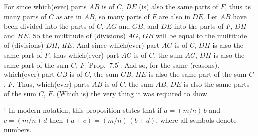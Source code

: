 \begin{Parallel}{}{}
{For since which(ever) parts $AB$ is of $C$, $DE$ (is) also the same parts  of $F$,
thus as many parts of $C$ as are in $AB$, so many 
 parts of $F$ are also in $DE$. Let $AB$ have been divided into the parts of
$C$, $AG$ and $GB$, and $DE$ into the parts of $F$, $DH$ and $HE$. So the
multitude of (divisions) $AG$, $GB$ will be equal to the multitude
of (divisions) $DH$, $HE$. And since which(ever) part $AG$ is of $C$, $DH$ is
also the same part of $F$, thus which(ever) part $AG$ is of $C$, the sum $AG$, $DH$
is  also the same part of the sum $C$, $F$ [Prop.~7.5].  And so, for the same (reasons), 
which(ever) part $GB$ is of $C$, the sum $GB$, $HE$ is also
the same part of the sum $C$, $F$. Thus, which(ever) parts $AB$ is of $C$, the
sum $AB$, $DE$ is also the same parts of the sum $C$, $F$. (Which is)
the very thing it was required to show.}
\end{Parallel}
{\footnotesize\noindent$^\dag$ In modern notation,
this proposition states that if $a = (m/n)\,b$ and $c=(m/n)\,d$
then $(a+c) = (m/n)\,(b+d)$, where all symbols denote numbers.}

